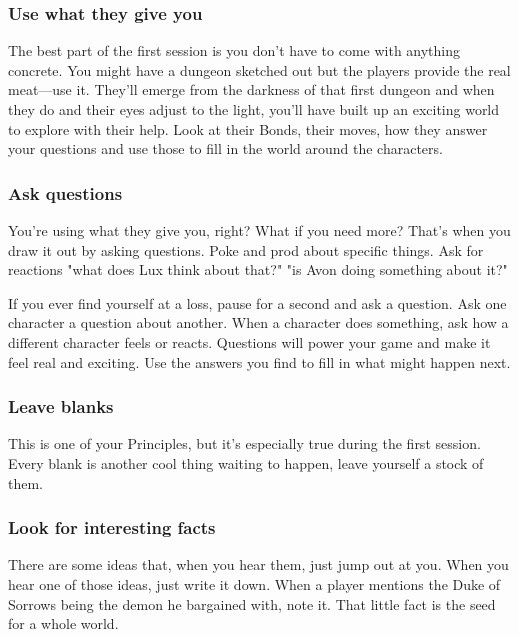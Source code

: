  
\subsubsection{Use what they give you}   
 

The best part of the first session is you don't have to come with anything concrete. You might have a dungeon sketched out but the players provide the real meat—use it. They'll emerge from the darkness of that first dungeon and when they do and their eyes adjust to the light, you'll have built up an exciting world to explore with their help. Look at their Bonds, their moves, how they answer your questions and use those to fill in the world around the characters.

 
\subsubsection{Ask questions}   
 

You're using what they give you, right? What if you need more? That's when you draw it out by asking questions. Poke and prod about specific things. Ask for reactions "what does Lux think about that?" "is Avon doing something about it?"

 

If you ever find yourself at a loss, pause for a second and ask a question. Ask one character a question about another. When a character does something, ask how a different character feels or reacts. Questions will power your game and make it feel real and exciting. Use the answers you find to fill in what might happen next.

 
\subsubsection{Leave blanks}    
 

This is one of your Principles, but it's especially true during the first session. Every blank is another cool thing waiting to happen, leave yourself a stock of them.

 
\subsubsection{Look for interesting facts}   
 

There are some ideas that, when you hear them, just jump out at you. When you hear one of those ideas, just write it down. When a player mentions the Duke of Sorrows being the demon he bargained with, note it. That little fact is the seed for a whole world.

